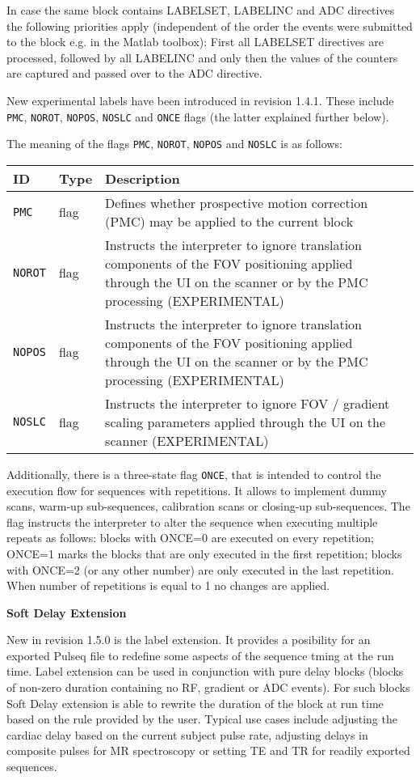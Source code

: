 \documentclass{article}
\begin{document}
In case the same block contains LABELSET, LABELINC and ADC directives the following priorities apply (independent of the order the events were submitted to the block e.g. in the Matlab toolbox): First all LABELSET directives are processed, followed by all LABELINC and only then the values of the counters are captured and passed over to the ADC directive.  

New experimental labels have been introduced in revision 1.4.1. These include \verb.PMC., \verb.NOROT., \verb.NOPOS., \verb.NOSLC. and \verb.ONCE. flags (the latter explained further below). 

The meaning of the flags \verb.PMC., \verb.NOROT., \verb.NOPOS. and \verb.NOSLC. is as follows:

\begin{tabularx}{\textwidth}{llXl}
\toprule
ID & Type & Description\\
\midrule
\verb.PMC. & flag & Defines whether prospective motion correction (PMC) may be applied to the current block \\
\verb.NOROT. & flag & Instructs the interpreter to ignore translation components of the FOV positioning applied through the UI on the scanner or by the PMC processing (EXPERIMENTAL) \\
\verb.NOPOS. & flag & Instructs the interpreter to ignore translation components of the FOV positioning applied through the UI on the scanner or by the PMC processing (EXPERIMENTAL) \\
\verb.NOSLC. & flag & Instructs the interpreter to ignore FOV / gradient scaling parameters applied through the UI on the scanner (EXPERIMENTAL) \\
\bottomrule
\end{tabularx}

Additionally, there is a three-state flag \verb.ONCE., that is intended to control the execution flow for sequences with repetitions. It allows to implement dummy scans, warm-up sub-sequences, calibration scans or closing-up sub-sequences. The flag instructs the interpreter to alter the sequence when executing multiple repeats as follows: blocks with ONCE=0 are executed on every repetition; ONCE=1 marks the blocks that are only executed in the first repetition; blocks with ONCE=2 (or any other number) are only executed in the last repetition. When number of repetitions is equal to 1 no changes are applied.

\textbf{Soft Delay Extension}

New in revision 1.5.0 is the label extension. It provides a posibility for an exported Pulseq file to redefine some aspects of the sequence tming at the run time. Label extension can be used in conjunction with pure delay blocks (blocks of non-zero duration containing no RF, gradient or ADC events). For such blocks Soft Delay extension is able to rewrite the duration of the block at run time based on the rule provided by the user. Typical use cases include adjusting the cardiac delay based on the current subject pulse rate, adjusting delays in composite pulses for MR spectroscopy or setting TE and TR for readily exported sequences. 
\end{document}
